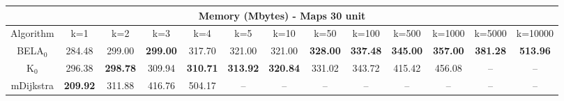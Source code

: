 \begin{tabular}{c|cccccccccccc}\toprule
\multicolumn{13}{c}{Memory (Mbytes) - Maps 30 unit}\\ \midrule
Algorithm & k=1 & k=2 & k=3 & k=4 & k=5 & k=10 & k=50 & k=100 & k=500 & k=1000 & k=5000 & k=10000 \\ \midrule
BELA$_0$ & 284.48 & 299.00 & \textbf{299.00} & 317.70 & 321.00 & 321.00 & \textbf{328.00} & \textbf{337.48} & \textbf{345.00} & \textbf{357.00} & \textbf{381.28} & \textbf{513.96} \\
K$_0$ & 296.38 & \textbf{298.78} & 309.94 & \textbf{310.71} & \textbf{313.92} & \textbf{320.84} & 331.02 & 343.72 & 415.42 & 456.08 & -- & -- \\
mDijkstra & \textbf{209.92} & 311.88 & 416.76 & 504.17 & -- & -- & -- & -- & -- & -- & -- & -- \\ \bottomrule 
\end{tabular}
